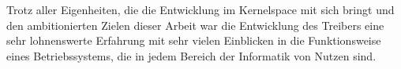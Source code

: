 Trotz aller Eigenheiten, die die Entwicklung im Kernelspace mit sich bringt und den ambitionierten Zielen dieser Arbeit war die Entwicklung des Treibers eine sehr lohnenswerte Erfahrung mit sehr vielen Einblicken in die Funktionsweise eines Betriebssystems, die in jedem Bereich der Informatik von Nutzen sind. 

 